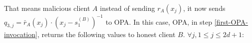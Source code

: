 That means  malicious client $A$ instead of sending   $r_{\scriptscriptstyle A}(x_{\scriptscriptstyle j})$, it now  sends $q_{\scriptscriptstyle 3,j}=\bar{r}_{\scriptscriptstyle A}(x_{\scriptscriptstyle j})\cdot (x_{\scriptscriptstyle j}-s^{\scriptscriptstyle(B)}_{\scriptscriptstyle 1})^{\scriptscriptstyle -1}$ to OPA. In this case, OPA, in step \ref{first-OPA-invocation},  returns the following values to honest client $B$. $\forall j, 1\leq j \leq 2d+1:$







%
%


